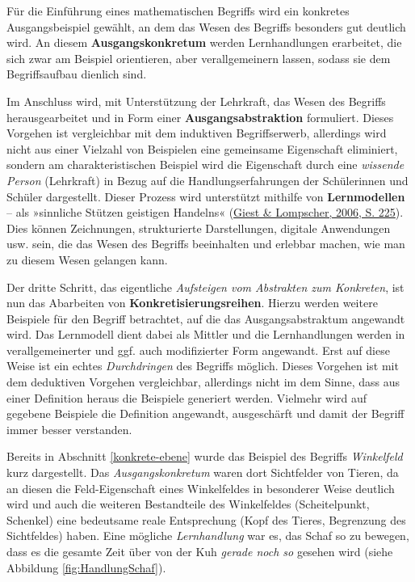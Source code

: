 \documentclass[
  ngerman,
]{scrbook}
\theoremstyle{definition}
\theoremstyle{definition}
\theoremstyle{definition}
\theoremstyle{definition}
\theoremstyle{remark}
\begin{document}
Für die Einführung eines mathematischen Begriffs wird ein konkretes Ausgangsbeispiel gewählt, an dem das Wesen des Begriffs besonders gut deutlich wird. An diesem \textbf{Ausgangskonkretum} werden Lernhandlungen erarbeitet, die sich zwar am Beispiel orientieren, aber verallgemeinern lassen, sodass sie dem Begriffsaufbau dienlich sind.

Im Anschluss wird, mit Unterstützung der Lehrkraft, das Wesen des Begriffs herausgearbeitet und in Form einer \textbf{Ausgangsabstraktion} formuliert. Dieses Vorgehen ist vergleichbar mit dem induktiven Begriffserwerb, allerdings wird nicht aus einer Vielzahl von Beispielen eine gemeinsame Eigenschaft eliminiert, sondern am charakteristischen Beispiel wird die Eigenschaft durch eine \emph{wissende Person} (Lehrkraft) in Bezug auf die Handlungserfahrungen der Schülerinnen und Schüler dargestellt. Dieser Prozess wird unterstützt mithilfe von \textbf{Lernmodellen} -- als »sinnliche Stützen geistigen Handelns« (\protect\hyperlink{ref-Giest2006}{Giest \& Lompscher, 2006, S. 225}). Dies können Zeichnungen, strukturierte Darstellungen, digitale Anwendungen usw. sein, die das Wesen des Begriffs beeinhalten und erlebbar machen, wie man zu diesem Wesen gelangen kann.

Der dritte Schritt, das eigentliche \emph{Aufsteigen vom Abstrakten zum Konkreten}, ist nun das Abarbeiten von \textbf{Konkretisierungsreihen}. Hierzu werden weitere Beispiele für den Begriff betrachtet, auf die das Ausgangsabstraktum angewandt wird. Das Lernmodell dient dabei als Mittler und die Lernhandlungen werden in verallgemeinerter und ggf. auch modifizierter Form angewandt. Erst auf diese Weise ist ein echtes \emph{Durchdringen} des Begriffs möglich. Dieses Vorgehen ist mit dem deduktiven Vorgehen vergleichbar, allerdings nicht im dem Sinne, dass aus einer Definition heraus die Beispiele generiert werden. Vielmehr wird auf gegebene Beispiele die Definition angewandt, ausgeschärft und damit der Begriff immer besser verstanden.

Bereits in Abschnitt \ref{konkrete-ebene} wurde das Beispiel des Begriffs \emph{Winkelfeld} kurz dargestellt. Das \emph{Ausgangskonkretum} waren dort Sichtfelder von Tieren, da an diesen die Feld-Eigenschaft eines Winkelfeldes in besonderer Weise deutlich wird und auch die weiteren Bestandteile des Winkelfeldes (Scheitelpunkt, Schenkel) eine bedeutsame reale Entsprechung (Kopf des Tieres, Begrenzung des Sichtfeldes) haben. Eine mögliche \emph{Lernhandlung} war es, das Schaf so zu bewegen, dass es die gesamte Zeit über von der Kuh \emph{gerade noch so} gesehen wird (siehe Abbildung \ref{fig:HandlungSchaf}).
\end{document}
